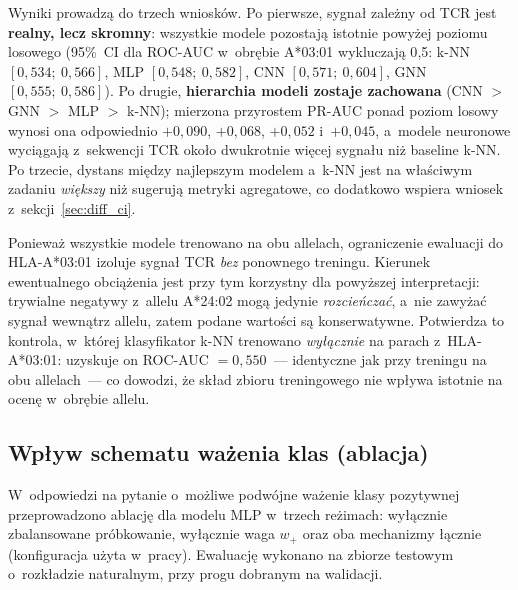 \documentclass{SGGW-thesis}
\begin{document}
Wyniki prowadzą do trzech wniosków. Po pierwsze, sygnał zależny od TCR jest
\textbf{realny, lecz skromny}: wszystkie modele pozostają istotnie powyżej poziomu
losowego (95\%~CI dla ROC-AUC w~obrębie A*03:01 wykluczają 0{,}5: k-NN $[0{,}534;\ 0{,}566]$,
MLP $[0{,}548;\ 0{,}582]$, CNN $[0{,}571;\ 0{,}604]$, GNN $[0{,}555;\ 0{,}586]$). Po drugie,
\textbf{hierarchia modeli zostaje zachowana} (CNN $>$ GNN $>$ MLP $>$ k-NN); mierzona
przyrostem PR-AUC ponad poziom losowy wynosi ona odpowiednio $+0{,}090$, $+0{,}068$,
$+0{,}052$ i~$+0{,}045$, a~modele neuronowe wyciągają z~sekwencji TCR około dwukrotnie
więcej sygnału niż baseline k-NN. Po trzecie, dystans między najlepszym modelem a~k-NN
jest na właściwym zadaniu \textit{większy} niż sugerują metryki agregatowe, co dodatkowo
wspiera wniosek z~sekcji~\ref{sec:diff_ci}.

Ponieważ wszystkie modele trenowano na obu allelach, ograniczenie ewaluacji do
HLA-A*03:01 izoluje sygnał TCR \textit{bez} ponownego treningu. Kierunek ewentualnego
obciążenia jest przy tym korzystny dla powyższej interpretacji: trywialne negatywy
z~allelu A*24:02 mogą jedynie \textit{rozcieńczać}, a~nie zawyżać sygnał wewnątrz allelu,
zatem podane wartości są konserwatywne. Potwierdza to kontrola, w~której klasyfikator k-NN
trenowano \textit{wyłącznie} na parach z~HLA-A*03:01: uzyskuje on ROC-AUC ${=}0{,}550$~---
identyczne jak przy treningu na obu allelach~--- co dowodzi, że skład zbioru treningowego
nie wpływa istotnie na ocenę w~obrębie allelu.

\subsection{Wpływ schematu ważenia klas (ablacja)}
\label{sec:weighting_ablation}

W~odpowiedzi na pytanie o~możliwe podwójne ważenie klasy pozytywnej przeprowadzono ablację
dla modelu MLP w~trzech reżimach: wyłącznie zbalansowane próbkowanie, wyłącznie waga $w_+$
oraz oba mechanizmy łącznie (konfiguracja użyta w~pracy). Ewaluację wykonano na zbiorze
testowym o~rozkładzie naturalnym, przy progu dobranym na walidacji.
\end{document}
